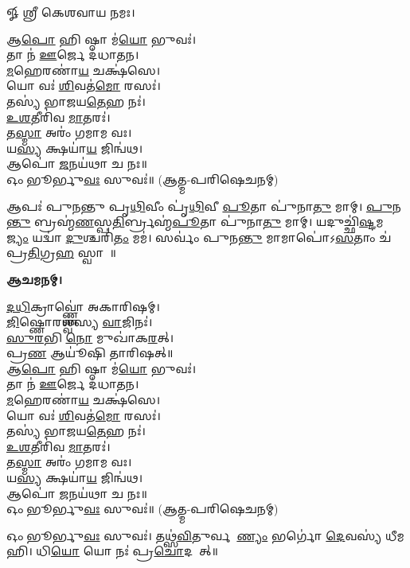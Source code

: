 
𑍐 𑌶𑍍𑌰𑍀 𑌕𑍇𑌶𑌵𑌾𑌯 𑌨𑌮𑌃।

𑌆\ul{𑌪𑍋} 𑌹𑌿 𑌷𑍍𑌠𑌾 𑌮॑\ul{𑌯𑍋} 𑌭𑍁𑌵𑌃॑।\\
𑌤𑌾 𑌨॑ \ul{𑌊}𑌰𑍍𑌜𑍇 𑌦॑𑌧𑌾𑌤𑌨।\\
\ul{𑌮}𑌹𑍇𑌰𑌣𑌾॑\ul{𑌯} 𑌚𑌕𑍍𑌷॑𑌸𑍇।\\
𑌯𑍋 𑌵𑌃॑ \ul{𑌶𑌿}𑌵𑌤॑\ul{𑌮𑍋} 𑌰𑌸𑌃॑।\\
𑌤𑌸𑍍𑌯॑ 𑌭𑌾𑌜𑌯\ul{𑌤𑍇}𑌹 𑌨𑌃॑।\\
\ul{𑌉}\ul{𑌶}𑌤𑍀𑌰𑌿॑𑌵 \ul{𑌮𑌾}𑌤𑌰𑌃॑।\\
𑌤\ul{𑌸𑍍𑌮𑌾} 𑌅𑌰𑌂॑ 𑌗𑌮𑌾𑌮 𑌵𑌃।\\
𑌯\ul{𑌸𑍍𑌯} 𑌕𑍍𑌷𑌯𑌾॑\ul{𑌯} 𑌜𑌿𑌨𑍍𑌵॑𑌥।\\
𑌆𑌪𑍋॑ \ul{𑌜}𑌨𑌯॑𑌥𑌾 𑌚 𑌨𑌃॥\\

𑌓𑌂 𑌭𑍂𑌰𑍍𑌭𑍁\ul{𑌵𑌃} 𑌸𑍁𑌵𑌃॑॥ (𑌆𑌤𑍍𑌮-𑌪𑌰𑌿𑌷𑍇𑌚𑌨𑌮𑍍)


𑌆𑌪𑌃॑ 𑌪𑍁𑌨𑌨𑍍𑌤𑍁 𑌪𑍃\ul{𑌥𑌿}𑌵𑍀𑌂 𑌪𑍃॑\ul{𑌥𑌿}𑌵𑍀 \ul{𑌪𑍂}𑌤𑌾 𑌪𑍁॑𑌨𑌾\ul{𑌤𑍁} 𑌮𑌾𑌮𑍍। \ul{𑌪𑍁}𑌨\ul{𑌨𑍍𑌤𑍁} 𑌬𑍍𑌰𑌹𑍍𑌮॑\ul{𑌣}𑌸𑍍𑌪\ul{𑌤𑌿}𑌰𑍍𑌬𑍍𑌰𑌹𑍍𑌮॑\ul{𑌪𑍂}𑌤𑌾 𑌪𑍁॑𑌨𑌾\ul{𑌤𑍁} 𑌮𑌾𑌮𑍍। 𑌯𑌦𑍁𑌚𑍍𑌛𑌿॑\ul{𑌷𑍍𑌟}𑌮𑌭𑍋᳚\ul{𑌜𑍍𑌯𑌂} 𑌯𑌦𑍍𑌵𑌾॑ \ul{𑌦𑍁}𑌶𑍍𑌚𑌰𑌿॑\ul{𑌤𑌂} 𑌮𑌮॑। 𑌸𑌰𑍍𑌵𑌂॑ 𑌪𑍁𑌨\ul{𑌨𑍍𑌤𑍁} 𑌮𑌾𑌮𑌾𑌪𑍋॑𑌽\ul{𑌸}𑌤𑌾𑌂 𑌚॑ 𑌪𑍍𑌰\ul{𑌤𑌿}𑌗𑍍𑌰\ul{𑌹}\ul{} 𑌸𑍍𑌵𑌾𑌹𑌾᳚॥


\textbf{𑌆𑌚𑌮𑌨𑌮𑍍।}

\ul{𑌦}\ul{𑌧𑌿}𑌕𑍍𑌰𑌾𑌵𑍍𑌣𑍍𑌣𑍋॑ 𑌅𑌕𑌾𑌰𑌿𑌷𑌮𑍍।\\
 \ul{𑌜𑌿}𑌷𑍍𑌣𑍋𑌰𑌶𑍍𑌵॑𑌸𑍍𑌯 \ul{𑌵𑌾}𑌜𑌿𑌨𑌃॑।\\
\ul{𑌸𑍁}\ul{𑌰}𑌭𑌿 \ul{𑌨𑍋} 𑌮𑍁𑌖𑌾॑𑌕\ul{𑌰}𑌤𑍍।\\
𑌪𑍍𑌰\ul{𑌣} 𑌆𑌯𑍂॑𑌷𑌿 𑌤𑌾𑌰𑌿𑌷𑌤𑍍॥\\



𑌆\ul{𑌪𑍋} 𑌹𑌿 𑌷𑍍𑌠𑌾 𑌮॑\ul{𑌯𑍋} 𑌭𑍁𑌵𑌃॑।\\
𑌤𑌾 𑌨॑ \ul{𑌊}𑌰𑍍𑌜𑍇 𑌦॑𑌧𑌾𑌤𑌨।\\
\ul{𑌮}𑌹𑍇𑌰𑌣𑌾॑\ul{𑌯} 𑌚𑌕𑍍𑌷॑𑌸𑍇।\\
𑌯𑍋 𑌵𑌃॑ \ul{𑌶𑌿}𑌵𑌤॑\ul{𑌮𑍋} 𑌰𑌸𑌃॑।\\
𑌤𑌸𑍍𑌯॑ 𑌭𑌾𑌜𑌯\ul{𑌤𑍇}𑌹 𑌨𑌃॑।\\
\ul{𑌉}\ul{𑌶}𑌤𑍀𑌰𑌿॑𑌵 \ul{𑌮𑌾}𑌤𑌰𑌃॑।\\
𑌤\ul{𑌸𑍍𑌮𑌾} 𑌅𑌰𑌂॑ 𑌗𑌮𑌾𑌮 𑌵𑌃।\\
𑌯\ul{𑌸𑍍𑌯} 𑌕𑍍𑌷𑌯𑌾॑\ul{𑌯} 𑌜𑌿𑌨𑍍𑌵॑𑌥।\\
𑌆𑌪𑍋॑ \ul{𑌜}𑌨𑌯॑𑌥𑌾 𑌚 𑌨𑌃॥\\

𑌓𑌂 𑌭𑍂𑌰𑍍𑌭𑍁\ul{𑌵𑌃} 𑌸𑍁𑌵𑌃॑॥ (𑌆𑌤𑍍𑌮-𑌪𑌰𑌿𑌷𑍇𑌚𑌨𑌮𑍍)



𑌓𑌂 𑌭𑍂𑌰𑍍𑌭𑍁\ul{𑌵𑌃} 𑌸𑍁𑌵𑌃॑। 𑌤𑌥𑍍𑌸॑\ul{𑌵𑌿}𑌤𑍁𑌰𑍍𑌵𑌰𑍇᳚\ul{𑌣𑍍𑌯𑌂} 𑌭𑌰𑍍𑌗𑍋॑ \ul{𑌦𑍇}𑌵𑌸𑍍𑌯॑ 𑌧𑍀𑌮𑌹𑌿। 𑌧𑌿\ul{𑌯𑍋} 𑌯𑍋 𑌨𑌃॑ 𑌪𑍍𑌰\ul{𑌚𑍋}𑌦𑌯𑌾᳚𑌤𑍍॥


